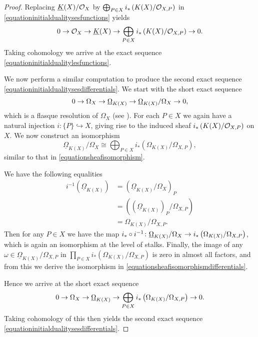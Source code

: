 \begin{proof}
    Replacing $\underline{K}(X)/{\cal O}_X$ by $\bigoplus_{P\in X} i_*\left(K(X)/{\cal O}_{X,P}\right)$ in \eqref{equationinitialdualitysesfunctions} yields
        \begin{equation}\label{equationshortexactsequencefunctionsdirectsum}
        0 \rightarrow {\cal O}_X \rightarrow \underline{K}(X) \rightarrow \bigoplus_{P \in X}i_* \left( K(X)/{\cal O}_{X,P} \right) \rightarrow 0.
        \end{equation}
    Taking cohomology we arrive at the exact sequence \eqref{equationinitialdualitylesfunctions}.
    
    We now perform a similar computation to produce the second exact sequence \eqref{equationinitialdualitysesdifferentials}.
    We start with the short exact sequence
        \[
        0 \rightarrow \Omega_X \rightarrow \underline{\Omega}_{K(X)} \rightarrow \underline{\Omega}_{K(X)}/\Omega_X \rightarrow 0,
        \]
    which is a flasque resolution of $\Omega_X$ (see \cite[Chap.\ II, ex.\ 1.16]{hart}).
    For each $P \in X$ we again have a natural injection $i \colon \{ P \} \hookrightarrow X$, giving rise to the induced sheaf $i_*\left( K(X)/{\cal O}_{X,P} \right)$ on $X$.
    We now construct an isomorphism
        \begin{equation}\label{equationsheafisomorphismdifferentials}
        \underline{\Omega}_{K(X)}/\Omega_X \cong \bigoplus_{P \in X} i_* \left( \Omega_{K(X)}/\Omega_{X,P}\right),
        \end{equation}
    similar to that in \eqref{equationsheafisomorphism}.

    We have the following equalities
        \begin{align*}
        i^{-1} \left( \underline{\Omega}_{K(X)} \right) & = \left( \underline{\Omega}_{K(X)}/\Omega_X \right)_P \\  
        & = \left(\left(\underline{\Omega}_{K(X)}\right)_P/\Omega_{X,P} \right) \\
        & = \Omega_{K(X)}/\Omega_{X,P}.
        \end{align*}
    Then for any $P \in X$ we have the map $i_* \circ i^{-1} \colon \underline{\Omega}_{K(X)}/\Omega_X \rightarrow i_*\left( \Omega_{K(X)}/\Omega_{X,P} \right)$, which is again an isomorphism at the level of stalks.
    Finally, the image of any $\omega \in \underline{\Omega}_{K(X)}/\Omega_{X,P}$ in $\prod_{P \in X} i_*\left( \Omega_{K(X)}/\Omega_{X,P}\right)$ is zero in almost all factors, and from this we derive the isomorphism in \eqref{equationsheafisomorphismdifferentials}.

    Hence we arrive at the short exact sequence
        \begin{equation}\label{equationshortexactsequencedifferentialsdirectsum}
        0 \rightarrow \Omega_X \rightarrow \underline{\Omega}_{K(X)} \rightarrow \bigoplus_{P \in X} i_* \left( \Omega_{K(X)}/\Omega_{X,P} \right)  \rightarrow 0.
        \end{equation}
    Taking cohomology of this then yields the second exact sequence \eqref{equationinitialdualitysesdifferentials}.
    \end{proof}

